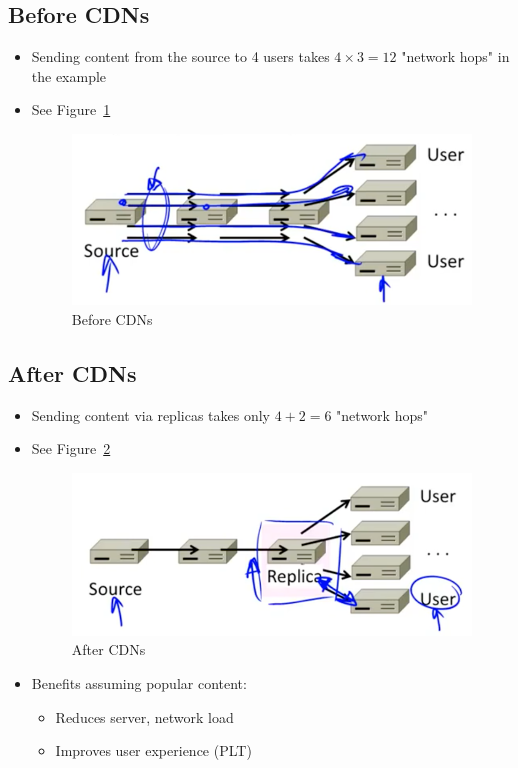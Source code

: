 \documentclass[12pt]{ctexart}   %
\begin{document}
	\subsection{Before CDNs}
	\begin{itemize}
		\item Sending content from the source to 4 users takes $4 \times 3 = 12$ "network hops" in the example
		\item See Figure~\ref{fig:8-7-2}
		  
		 \begin{figure}[h!] %
		\centering
		 \includegraphics[scale=0.7]{images/8-7-2}
		\caption{ Before CDNs }
		 \label{fig:8-7-2}
		 \end{figure}
	\end{itemize}
	
	\subsection{After CDNs}
	\begin{itemize}
		\item Sending content via replicas takes only $4 + 2 = 6$ "network hops"
		\item See Figure~\ref{fig:8-7-3}
		  
		 \begin{figure}[h!] %
		\centering
		 \includegraphics[scale=0.7]{images/8-7-3}
		\caption{ After CDNs }
		 \label{fig:8-7-3}
		 \end{figure}
		 
		 \item Benefits assuming popular content:
		 \begin{itemize}
		 	\item Reduces server, network load
		 	\item Improves user experience (PLT)
		 \end{itemize}
	\end{itemize}
	
\end{document}
